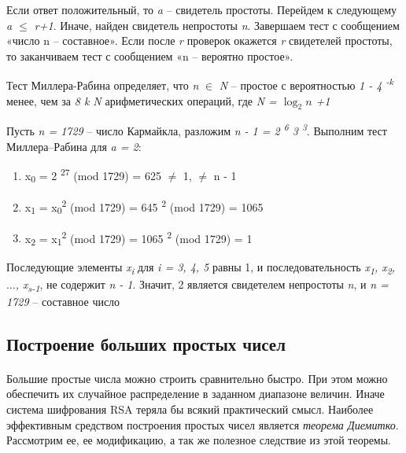   Если ответ положительный, то \textit{a} – свидетель простоты. Перейдем к следующему \textit{a {$\leq$} r+1}. Иначе, найден свидетель 
непростоты \textit{n}. Завершаем тест с сообщением «число n – составное». Если после \textit{r} проверок окажется \textit{r} свидетелей
простоты, то заканчиваем тест с сообщением «n – вероятно простое».

  \begin{statement}

      Тест Миллера-Рабина определяет, что \textit{n} {$\in$} \textit{N} – простое с вероятностью
    \textit{1 - 4\textsuperscript{ -k}} менее, чем за \textit{8 k N} арифметических операций, где \textit{N = {$\log_{2}{n}$} +1 }
    
  \end{statement}

  \begin{example}    
  
      Пусть \textit{n = 1729} – число Кармайкла, разложим \textit{n - 1 = 2\textsuperscript{ 6} 3\textsuperscript{ 3}}. 
    Выполним тест Миллера–Рабина для \textit{a = 2}:
    
    \begin{enumerate}
    \item x\textsubscript{0} = 2\textsuperscript{ 27} (mod 1729) = 625 {$\ne$} 1, {$\ne$} n - 1
    \item x\textsubscript{1} = x\textsubscript{0}\textsuperscript{2} (mod 1729) = 645\textsuperscript{ 2} (mod 1729) = 1065
    \item x\textsubscript{2} = x\textsubscript{1}\textsuperscript{2} (mod 1729) = 1065\textsuperscript{ 2} (mod 1729) = 1
    \end{enumerate}
    
    Последующие элементы \textit{{x\textsubscript{i}}} для \textit{i = 3, 4, 5} равны 1, и последовательность 
  \textit{{x\textsubscript{1}, x\textsubscript{2}, {$\dots$}, x\textsubscript{s-1}}}, 
  не содержит \textit{n - 1}. Значит, 2 является свидетелем непростоты \textit{n}, и \textit{n = 1729} – составное число
  
  \end{example}

\subsection{Построение больших простых чисел}

\paragraph{} Большие простые числа можно строить сравнительно быстро. При этом можно обеспечить их случайное распределение в 
заданном диапазоне величин. Иначе система шифрования RSA теряла бы всякий практический смысл. Наиболее эффективным средством 
построения простых чисел является \textit{теорема Диемитко}. Рассмотрим ее, ее модификацию, а так же полезное следствие из этой теоремы.

